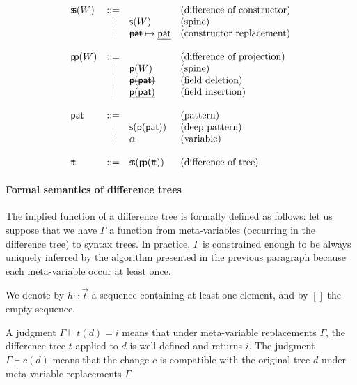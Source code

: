 \documentclass[a4paper,11pt]{article}
\renewcommand\vec[1]{\overrightarrow{#1}}
\newcommand\del[1]{\text{\st{$#1$}}}
\newcommand\ins[1]{\text{\ul{$#1$}}}
\begin{document}
\[\begin{array}{lcll}
\aSpineSum(W) & ::= & & \text{(difference of constructor)} \\
        & |   & \aSum(W) & \text{(spine)} \\
        & |   & \defReplace \aPatternTree \aPatternTree & \text{(constructor replacement)} \\
\\
\aSpineProd(W) & ::= & & \text{(difference of projection)} \\
                 & |   & \aProd(W) & \text{(spine)} \\
                 & |   & \del{\aProd(\aPatternTree)} & \text{(field deletion)} \\
                 & |   & \ins{\aProd(\aPatternTree)} & \text{(field insertion)} \\
\\
\aPatternTree & ::= & & \text{(pattern)} \\
        & |   & \aSum(\aProd(\aPatternTree)) & \text{(deep pattern)}\\
        & |   & \aVar & \text{(variable)} \\
\\
\aDiffTree & ::= & \aSpineSum(\aSpineProd(\aDiffTree)) & \text{(difference of tree)} \\
\end{array}\]

\paragraph{Formal semantics of difference trees}

The implied function of a difference tree is formally defined as follows: let
us suppose that we have $\Gamma$ a function from meta-variables (occurring in
the difference tree) to syntax trees. In practice, $\Gamma$ is constrained
enough to be always uniquely inferred by the algorithm presented in the
previous paragraph because each meta-variable occur at least once.

We denote by $h :: \vec{t}$ a sequence containing at least one element, and by
$[]$ the empty sequence.

A judgment $\Gamma \vdash t(d) = i$ means that under meta-variable replacements
$\Gamma$, the difference tree $t$ applied to $d$ is well defined and returns
$i$. The judgment $\Gamma \vdash c(d)$ means that the change $c$ is compatible
with the original tree $d$ under meta-variable replacements $\Gamma$.
\end{document}
